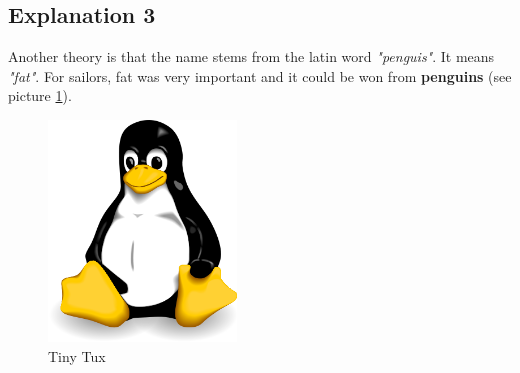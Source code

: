 \newpage
\subsection{Explanation 3}
Another theory is that the name stems from the latin word \emph{"penguis"}. It means \emph{"fat"}. For sailors, fat was very important and it could be won from \textbf{penguins} (see picture \ref{img:tux}).

\begin{figure}[H]
\begin{center}
\includegraphics[width=5cm]{images/tux.png}
\caption{Tiny Tux}
\label{img:tux}
\end{center}
\end{figure}
